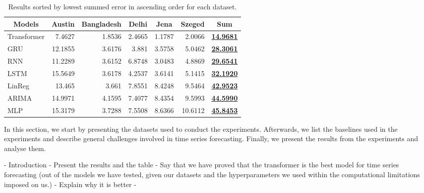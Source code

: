 \begin{table*}[t]
    \centering
    \caption {Results sorted by lowest summed error in ascending order for each dataset.} \label{tab:ResultsTableSummed} 
    \begin{tabular}{|l|r|r|r|r|r|r|}
    \hline
        \multicolumn{1}{|c|}{Models} & \multicolumn{1}{c|}{Austin} & \multicolumn{1}{c|}{Bangladesh} & \multicolumn{1}{c|}{Delhi} & \multicolumn{1}{c|}{Jena} & \multicolumn{1}{c|}{Szeged} & \multicolumn{1}{c|}{Sum} \\ \hline
        Transformer & 7.4627 & 1.8536 & 2.4665 & 1.1787 & 2.0066 & {\ul{\textbf{14.9681}}} \\ \hline
        GRU & 12.1855 & 3.6176 & 3.881 & 3.5758 & 5.0462 & {\ul{\textbf{28.3061}}} \\ \hline
        RNN & 11.2289 & 3.6152 & 6.8748 & 3.0483 & 4.8869 & {\ul{\textbf{29.6541}}} \\ \hline
        LSTM & 15.5649 & 3.6178 & 4.2537 & 3.6141 & 5.1415 & {\ul{\textbf{32.1920}}} \\ \hline
        LinReg & 13.465 & 3.661 & 7.8551 & 8.4248 & 9.5464 & {\ul{\textbf{42.9523}}} \\ \hline
        ARIMA & 14.9971 & 4.1595 & 7.4077 & 8.4354 & 9.5993 & {\ul{\textbf{44.5990}}} \\ \hline
        MLP & 15.3179 & 3.7288 & 7.5508 & 8.6366 & 10.6112 & {\ul{\textbf{45.8453}}} \\ \hline
    \end{tabular}
\end{table*}

In this section, we start by presenting the datasets used to conduct the experiments.
Afterwards, we list the baselines used in the experiments and describe general challenges involved in time series forecasting.
Finally, we present the results from the experiments and analyse them.

- Introduction 
- Present the results and the table
- Say that we have proved that the transformer is the best model for time series forecasting (out of the models we have tested, given our datasets and the hyperparameters we used within the computational limitations imposed on us.)
    - Explain why it is better 
    - 

    
